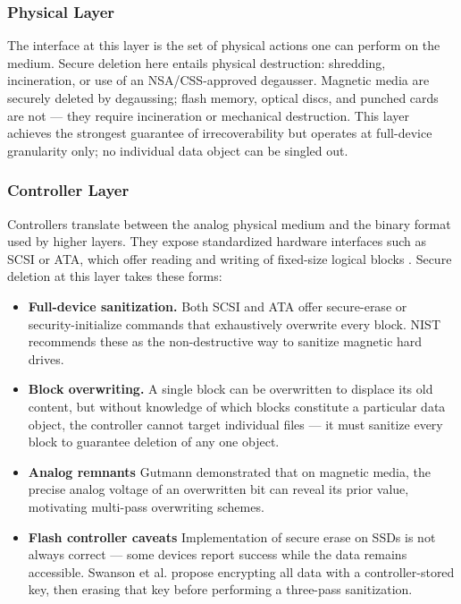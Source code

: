 \subsubsection{Physical Layer}
The interface at this layer is the set of physical actions one can perform on the medium. Secure 
deletion here entails physical destruction: shredding, incineration, or use of an NSA/CSS-approved 
degausser. Magnetic media are securely deleted by degaussing; flash memory, optical discs, and 
punched cards are not — they require incineration or mechanical destruction. This layer achieves the 
strongest guarantee of irrecoverability but operates at full-device granularity only; no individual 
data object can be singled out.

\subsubsection{Controller Layer}
Controllers translate between the analog physical medium and the binary format used by higher layers. 
They expose standardized hardware interfaces such as SCSI or ATA, which offer reading and writing of 
fixed-size logical blocks \cite{reardon2013sok}. Secure deletion at this layer takes these forms:
\begin{itemize}
    \item \textbf{Full-device sanitization.} Both SCSI and ATA offer secure-erase or security-initialize 
    commands that exhaustively overwrite every block. NIST recommends these as the non-destructive 
    way to sanitize magnetic hard drives.
    
    \item \textbf{Block overwriting.} A single block can be overwritten to displace its old content, 
    but without knowledge of which blocks constitute a particular data object, the controller cannot 
    target individual files — it must sanitize every block to guarantee deletion of any one object.

    \item \textbf{Analog remnants} Gutmann demonstrated that on magnetic media, the precise analog 
    voltage of an overwritten bit can reveal its prior value, motivating multi-pass overwriting 
    schemes.

    \item \textbf{Flash controller caveats} Implementation of secure erase on SSDs is not always 
    correct — some devices report success while the data remains accessible. Swanson et al. propose 
    encrypting all data with a controller-stored key, then erasing that key before performing a 
    three-pass sanitization.

\end{itemize}

